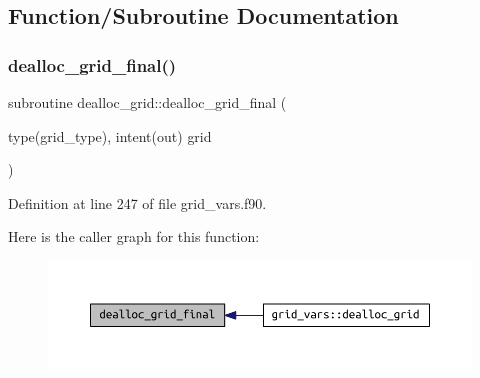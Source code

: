 \subsection{Function/\+Subroutine Documentation}
\mbox{\label{grid__vars_8f90_ad8906f7cbf740b674a5036d6b952ae48}} 
\subsubsection{\texorpdfstring{dealloc\+\_\+grid\+\_\+final()}{dealloc\_grid\_final()}}
{\footnotesize\ttfamily subroutine dealloc\+\_\+grid\+::dealloc\+\_\+grid\+\_\+final (\begin{DoxyParamCaption}\item[{type(grid\+\_\+type), intent(out)}]{grid }\end{DoxyParamCaption})}



Definition at line 247 of file grid\+\_\+vars.\+f90.

Here is the caller graph for this function\+:
\nopagebreak
\begin{figure}[H]
\begin{center}
\leavevmode
\includegraphics[width=350pt]{grid__vars_8f90_ad8906f7cbf740b674a5036d6b952ae48_icgraph}
\end{center}
\end{figure}
